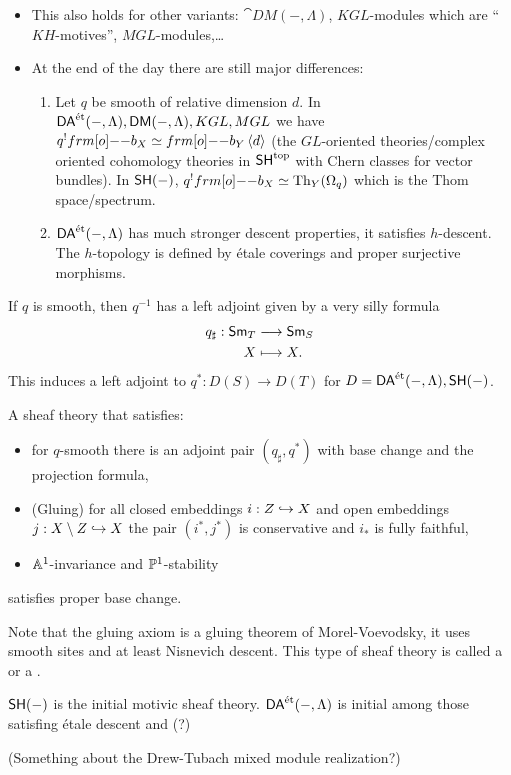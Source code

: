 \begin{remark}\leavevmode
	\begin{itemize}
		\item This also holds for other variants: $\cat{DM}(-,\Lambda)$, $KGL$-modules which are ``$KH$-motives'',  $MGL$-modules,\dots 
		\item At the end of the day there are still major differences:
			\begin{enumerate}[1)]
				\item Let $q$ be smooth of relative dimension $d$. In $\DAet(-,\Lambda), \cat{DM}(-,\Lambda), KGL, MGL$ we have $q^{!}\1b_X \isoto \1b_Y \left<d \right>$ (the $GL$-oriented theories/complex oriented cohomology theories in $\SH^{\text{top}}$ with Chern classes for vector bundles). In $\SH(-)$, $q^{!}\1b_X\isoto \operatorname{Th}_Y(\Omega_q)$ which is the Thom space/spectrum.
				\item $\DAet(-,\Lambda)$ has much stronger descent properties, it satisfies $h$-descent.  The $h$-topology is defined by \'etale coverings and proper surjective morphisms.
			\end{enumerate}
	\end{itemize}
\end{remark}
If $q$ is smooth, then $q^{-1}$ has a left adjoint given by a very silly formula
\begin{align*}
	q_\sharp: \Sm_T &\longrightarrow \Sm_S \\
	X &\longmapsto X.
\end{align*}
This induces a left adjoint to $q^{*}:D(S)\to D(T)$ for $D=\DAet(-,\Lambda),\SH(-)$.

\begin{theorem}
	A sheaf theory that satisfies:
	\begin{itemize}
		\item for $q$-smooth there is an adjoint pair $(q_\sharp,q^{*})$ with base change and the projection formula,
		\item (Gluing) for all closed embeddings $i:Z\injto X$ and open embeddings $j:X\setminus Z\injto X$ the pair $(i^{*},j^{*})$ is conservative and $i_*$ is fully faithful,
		\item $\Aff^{1}$-invariance and $\P^{1}$-stability
	\end{itemize}
	satisfies proper base change.
\end{theorem}
Note that the gluing axiom is a gluing theorem of Morel-Voevodsky, it uses smooth sites and at least Nisnevich descent. This type of sheaf theory is called a  or a .
\begin{theorem}
	$\SH(-)$ is the initial motivic sheaf theory. $\DAet(-,\Lambda)$ is initial among those satisfing \'etale descent and (?)
\end{theorem}
(Something about the Drew-Tubach mixed module realization?)

